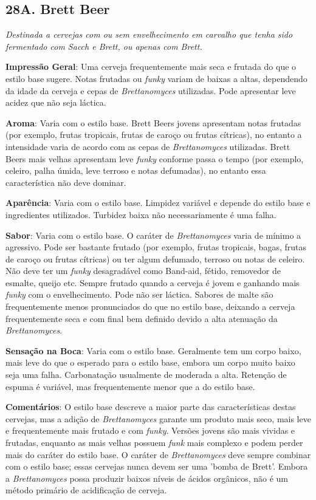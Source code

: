 \subsection*{28A. Brett Beer}
\textit{Destinada a cervejas com ou sem envelhecimento em carvalho que tenha sido fermentado com Sacch e Brett, ou apenas com Brett.}

\textbf{Impressão Geral}: Uma cerveja frequentemente mais seca e frutada do que o estilo base sugere. Notas frutadas ou \textit{funky} variam de baixas a altas, dependendo da idade da cerveja e cepas de \textit{Brettanomyces} utilizadas. Pode apresentar leve acidez que não seja láctica.

\textbf{Aroma}: Varia com o estilo base. Brett Beers jovens apresentam notas frutadas (por exemplo, frutas tropicais, frutas de caroço ou frutas cítricas), no entanto a intensidade varia de acordo com as cepas de \textit{Brettanomyces} utilizadas. Brett Beers mais velhas apresentam leve \textit{funky} conforme passa o tempo (por exemplo, celeiro, palha úmida, leve terroso e notas defumadas), no entanto essa característica não deve dominar.

\textbf{Aparência}: Varia com o estilo base. Limpidez variável e depende do estilo base e ingredientes utilizados. Turbidez baixa não necessariamente é uma falha.

\textbf{Sabor}: Varia com o estilo base. O caráter de \textit{Brettanomyces} varia de mínimo a agressivo. Pode ser bastante frutado (por exemplo, frutas tropicais, bagas, frutas de caroço ou frutas cítricas) ou ter algum defumado, terroso ou notas de celeiro. Não deve ter um \textit{funky} desagradável como Band-aid, fétido, removedor de esmalte, queijo etc. Sempre frutado quando a cerveja é jovem e ganhando mais \textit{funky} com o envelhecimento. Pode não ser láctica. Sabores de malte são frequentemente menos pronunciados do que no estilo base, deixando a cerveja frequentemente seca e com final bem definido devido a alta atenuação da \textit{Brettanomyces}.

\textbf{Sensação na Boca}: Varia com o estilo base. Geralmente tem um corpo baixo, mais leve do que o esperado para o estilo base, embora um corpo muito baixo seja uma falha. Carbonatação usualmente de moderada a alta. Retenção de espuma é variável, mas frequentemente menor que a do estilo base.

\textbf{Comentários}: O estilo base descreve a maior parte das características destas cervejas, mas a adição de \textit{Brettanomyces} garante um produto mais seco, mais leve e frequentemente mais frutado e com \textit{funky}. Versões jovens são mais vividas e frutadas, enquanto as mais velhas possuem \textit{funk} mais complexo e podem perder mais do caráter do estilo base. O caráter de \textit{Brettanomyces} deve sempre combinar com o estilo base; essas cervejas nunca devem ser uma 'bomba de Brett'. Embora a \textit{Brettanomyces} possa produzir baixos níveis de ácidos orgânicos, não é um método primário de acidificação de cerveja.

